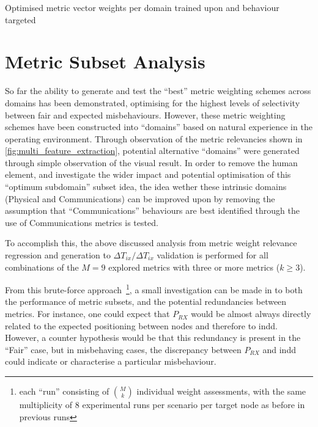 \begin{landscape}
  \begin{table}
    \centering
    \caption{Optimised metric vector weights per domain trained upon and behaviour targeted}
    
    \label{tab:optimised_weights}
  \end{table}
\end{landscape}

\section{Metric Subset Analysis}
So far the ability to generate and test the ``best'' metric weighting schemes across domains has been demonstrated, optimising for the highest levels of selectivity between fair and expected misbehaviours. 
However, these metric weighting schemes have been constructed into ``domains'' based on natural experience in the operating environment. 
Through observation of the metric relevancies shown in \autoref{fig:multi_feature_extraction}, potential alternative ``domains'' were generated through simple observation of the visual result.
In order to remove the human element, and investigate the wider impact and potential optimisation of this ``optimum subdomain'' subset idea, the idea wether these intrinsic  domains (Physical and Communications) can be improved upon by removing the assumption that ``Communications'' behaviours are best identified through the use of Communications metrics is tested.

To accomplish this, the above discussed analysis from metric weight relevance regression and generation to $\Delta{T}_{ix}/\Delta{T}_{ix}$ validation is performed for all combinations of the $M=9$ explored metrics with three or more metrics ($k\ge3$). 

From this brute-force approach~\footnote{each ``run'' consisting of ${M\choose{k}}$ individual weight assessments, with the same multiplicity of 8 experimental runs per scenario per target node as before in previous runs}, a small investigation can be made in to both the performance of metric subsets, and the potential redundancies between metrics. 
For instance, one could expect that $P_{RX}$ would be almost always directly related to the expected positioning between nodes and therefore to \gls{indd}.
However, a counter hypothesis would be that this redundancy is present in the ``Fair'' case, but in misbehaving cases, the discrepancy between $P_{RX}$ and \gls{indd} could indicate or characterise a particular misbehaviour. 

